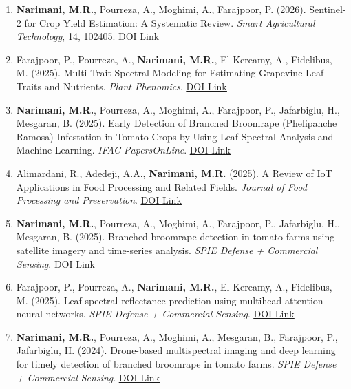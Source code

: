 \documentclass[11pt,a4paper]{article}
\begin{document}
\begin{enumerate}
\item \textbf{Narimani, M.R.}, Pourreza, A., Moghimi, A., Farajpoor, P. (2026). Sentinel-2 for Crop Yield Estimation: A Systematic Review. \textit{Smart Agricultural Technology}, 14, 102405. \href{https://doi.org/10.1016/j.atech.2026.102405}{\underline{DOI Link}}

\item Farajpoor, P., Pourreza, A., \textbf{Narimani, M.R.}, El‐Kereamy, A., Fidelibus, M. (2025). Multi-Trait Spectral Modeling for Estimating Grapevine Leaf Traits and Nutrients. \textit{Plant Phenomics}. \href{https://www.sciencedirect.com/science/article/pii/S2643651525001487}{\underline{DOI Link}}

\item \textbf{Narimani, M.R.}, Pourreza, A., Moghimi, A., Farajpoor, P., Jafarbiglu, H., Mesgaran, B. (2025). Early Detection of Branched Broomrape (Phelipanche Ramosa) Infestation in Tomato Crops by Using Leaf Spectral Analysis and Machine Learning. \textit{IFAC-PapersOnLine}. \href{https://www.sciencedirect.com/science/article/pii/S2405896325024711}{\underline{DOI Link}}

\item Alimardani, R., Adedeji, A.A., \textbf{Narimani, M.R.} (2025). A Review of IoT Applications in Food Processing and Related Fields. \textit{Journal of Food Processing and Preservation}. \href{https://onlinelibrary.wiley.com/doi/full/10.1155/jfpp/3064441}{\underline{DOI Link}}

\item \textbf{Narimani, M.R.}, Pourreza, A., Moghimi, A., Farajpoor, P., Jafarbiglu, H., Mesgaran, B. (2025). Branched broomrape detection in tomato farms using satellite imagery and time-series analysis. \textit{SPIE Defense + Commercial Sensing}. \href{https://doi.org/10.1117/12.3059998}{\underline{DOI Link}}

\item Farajpoor, P., Pourreza, A., \textbf{Narimani, M.R.}, El‐Kereamy, A., Fidelibus, M. (2025). Leaf spectral reflectance prediction using multihead attention neural networks. \textit{SPIE Defense + Commercial Sensing}. \href{https://doi.org/10.1117/12.3061298}{\underline{DOI Link}}

\item \textbf{Narimani, M.R.}, Pourreza, A., Moghimi, A., Mesgaran, B., Farajpoor, P., Jafarbiglu, H. (2024). Drone-based multispectral imaging and deep learning for timely detection of branched broomrape in tomato farms. \textit{SPIE Defense + Commercial Sensing}. \href{https://doi.org/10.1117/12.3021219}{\underline{DOI Link}}


\end{enumerate}
\end{document}
